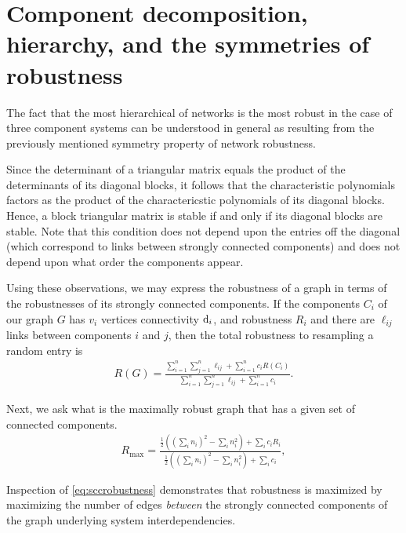 \section{Component decomposition, hierarchy, and the symmetries of robustness}

The fact that the most hierarchical of networks is the most robust in the case of three component systems can be understood in general as resulting from the previously mentioned symmetry property of network robustness.

Since the determinant of a triangular matrix equals the product of the determinants of its diagonal blocks, it follows that the characteristic polynomials factors as the product of the charactericstic polynomials of its diagonal blocks.  Hence, a block triangular matrix is stable if and only if its diagonal blocks are stable.  Note that this condition does not depend upon the entries off the diagonal (which correspond to links between strongly connected components) and does not depend upon what order the components appear.

Using these observations, we may express the robustness of a graph in terms of the robustnesses of its strongly connected components.
If the components $C_i$ of our graph $G$ has $v_i$ vertices connectivity $\mathrm{d}_i$, and robustness $R_i$ and there are $\ell_{ij}$ links between components $i$ and $j$, then the total robustness to resampling a random entry is
\begin{align}
R(G) = \frac{\sum_{i=1}^n \sum_{j=1}^n \ell_{ij} + \sum_{i=1}^n c_i R(C_i)}
            {\sum_{i=1}^n \sum_{j=1}^n \ell_{ij} + \sum_{i=1}^n c_i}. \label{eq:sccrobustness}
\end{align}

Next, we ask what is the maximally robust graph that has a given set of connected components.
\begin{align}
R_{\mathrm{max}} = \frac{\frac{1}{2} ((\sum_i n_i)^2 - \sum_i n_i^2) + \sum_i c_i R_i}{\frac{1}{2} ((\sum_i n_i)^2 - \sum_i n_i^2) + \sum_i c_i}, \label{eq:sccmaxrobustness}
\end{align}

Inspection of \ref{eq:sccrobustness} demonstrates that robustness is maximized by maximizing the number of edges \emph{between} the strongly connected components of the graph underlying system interdependencies.


